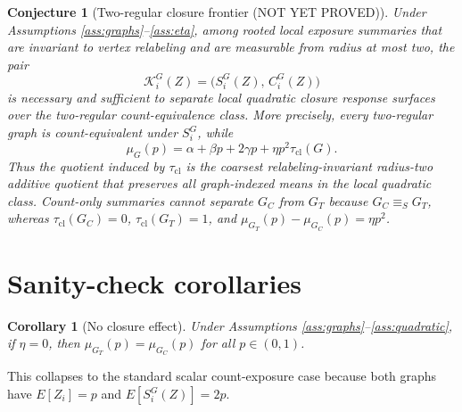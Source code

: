 \documentclass[11pt]{article}
\theoremstyle{definition}
\theoremstyle{plain}
\newtheorem{conjecture}{Conjecture}
\newtheorem{corollary}{Corollary}
\theoremstyle{remark}
\begin{document}
\begin{conjecture}[Two-regular closure frontier (NOT YET PROVED)]\label{conj:minimal-certificate}
Under Assumptions \ref{ass:graphs}--\ref{ass:eta}, among rooted local exposure summaries that are invariant to vertex relabeling and are measurable from radius at most two, the pair
\[
\mathcal{K}_i^G(Z)=\bigl(S_i^G(Z),\,C_i^G(Z)\bigr)
\]
is necessary and sufficient to separate local quadratic closure response surfaces over the two-regular count-equivalence class. More precisely, every two-regular graph is count-equivalent under \(S_i^G\), while
\[
\mu_G(p)=\alpha+\beta p+2\gamma p+\eta p^2\tau_{\mathrm{cl}}(G).
\]
Thus the quotient induced by \(\tau_{\mathrm{cl}}\) is the coarsest relabeling-invariant radius-two additive quotient that preserves all graph-indexed means in the local quadratic class. Count-only summaries cannot separate \(G_C\) from \(G_T\) because \(G_C\equiv_S G_T\), whereas \(\tau_{\mathrm{cl}}(G_C)=0\), \(\tau_{\mathrm{cl}}(G_T)=1\), and \(\mu_{G_T}(p)-\mu_{G_C}(p)=\eta p^2\).
\end{conjecture}

\section{Sanity-check corollaries}
\begin{corollary}[No closure effect]\label{cor:no-closure}
Under Assumptions \ref{ass:graphs}--\ref{ass:quadratic}, if \(\eta=0\), then \(\mu_{G_T}(p)=\mu_{G_C}(p)\) for all \(p\in(0,1)\).
\end{corollary}
This collapses to the standard scalar count-exposure case because both graphs have \(E[Z_i]=p\) and \(E[S_i^G(Z)]=2p\).
\end{document}
